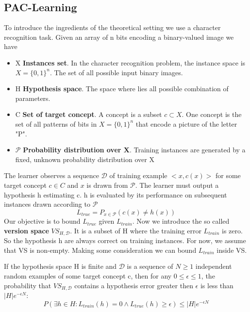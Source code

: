 \documentclass[../main.tex]{subfiles}
\begin{document}
\subsection{PAC-Learning}
To introduce the ingredients of the theoretical setting we use a character recognition task. Given an array of n bits encoding a binary-valued image we have
\begin{itemize}
    \item X \textbf{Instances set}. In the character recognition problem, the instance space is $X=\{0,1\}^{n}$. The set of all possible input binary images.
    \item H \textbf{Hypothesis space}. The space where lies all possible combination of parameters.
    \item C \textbf{Set of target concept}. A concept is a subset $c\subset X$. One concept is the set of all patterns of bits in  $X=\{0,1\}^{n}$ that encode a picture of the letter "P".
    \item $\mathcal{P}$ \textbf{Probability distribution over X}. Training instances are generated by a fixed, unknown probability distribution over X
\end{itemize}
The learner observes a sequence $\mathcal{D}$ of training example $<x,c(x)>$ for some target concept $c \in C$ and $x$ is drawn from $\mathcal{P}$. The learner must output a hypothesis h estimating c. h is evaluated by its performance on subsequent instances drawn according to $\mathcal{P}$
\begin{equation*}
    L_{true} = P_{x \in \mathcal{P}}(c(x) \neq h(x))
\end{equation*}
Our objective is to bound $L_{true}$ given $L_{train}$.
Now we introduce the so called \textbf{version space} $VS_{H,\mathcal{D}}$. It is a subset of H where the training error $L_{train}$ is zero. So the hypothesis h are always correct on training instances. For now, we assume that VS is non-empty. Making some consideration we can bound $L_{train}$ inside VS.
\begin{theorem}
    If the hypothesis space H is finite and $\mathcal{D}$ is a sequence of $N \geq 1$ independent random examples of some target concept c, then for any $0 \leq \epsilon \leq 1$, the probability that $VS_{H,\mathcal{D}}$ contains a hypothesis error greater then $\epsilon$ is less than $|H|e^{-\epsilon N}$:
    \begin{equation*}
        P(\exists h \in H: L_{train}(h)=0 \land L_{true}(h) \geq \epsilon) \leq |H|e^{-\epsilon N}
    \end{equation*}
\end{theorem}
\end{document}
